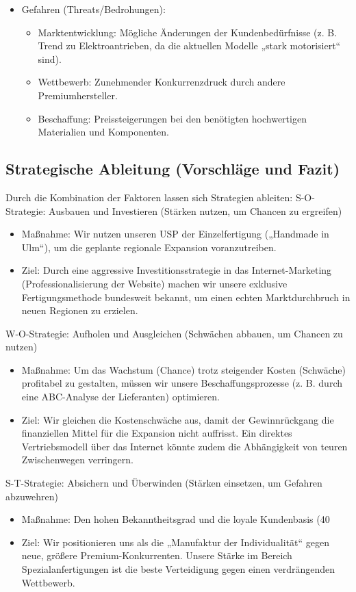 \documentclass[12pt, a4paper]{article}
\begin{document}
\begin{itemize}
    \item Gefahren (Threats/Bedrohungen):
        \begin{itemize}
            \item Marktentwicklung: Mögliche Änderungen der Kundenbedürfnisse (z. B. Trend zu Elektroantrieben, da die aktuellen Modelle „stark motorisiert“ sind).
            \item Wettbewerb: Zunehmender Konkurrenzdruck durch andere Premiumhersteller.
            \item Beschaffung: Preissteigerungen bei den benötigten hochwertigen Materialien und Komponenten.
        \end{itemize}
\end{itemize}

\subsection{Strategische Ableitung (Vorschläge und Fazit)}
Durch die Kombination der Faktoren lassen sich Strategien ableiten:
S-O-Strategie: Ausbauen und Investieren (Stärken nutzen, um Chancen zu ergreifen)
\begin{itemize}
    \item Maßnahme: Wir nutzen unseren USP der Einzelfertigung („Handmade in Ulm“), um die geplante regionale Expansion voranzutreiben.
    \item Ziel: Durch eine aggressive Investitionsstrategie in das Internet-Marketing (Professionalisierung der Website) machen wir unsere exklusive Fertigungsmethode bundesweit bekannt, um einen echten Marktdurchbruch in neuen Regionen zu erzielen.
\end{itemize}
W-O-Strategie: Aufholen und Ausgleichen (Schwächen abbauen, um Chancen zu nutzen)
\begin{itemize}
    \item Maßnahme: Um das Wachstum (Chance) trotz steigender Kosten (Schwäche) profitabel zu gestalten, müssen wir unsere Beschaffungsprozesse (z. B. durch eine ABC-Analyse der Lieferanten) optimieren.
    \item Ziel: Wir gleichen die Kostenschwäche aus, damit der Gewinnrückgang die finanziellen Mittel für die Expansion nicht auffrisst. Ein direktes Vertriebsmodell über das Internet könnte zudem die Abhängigkeit von teuren Zwischenwegen verringern.
\end{itemize}
 S-T-Strategie: Absichern und Überwinden (Stärken einsetzen, um Gefahren abzuwehren)
\begin{itemize}
    \item Maßnahme: Den hohen Bekanntheitsgrad und die loyale Kundenbasis (40 %
    \item Ziel: Wir positionieren uns als die „Manufaktur der Individualität“ gegen neue, größere Premium-Konkurrenten. Unsere Stärke im Bereich Spezialanfertigungen ist die beste Verteidigung gegen einen verdrängenden Wettbewerb.
\end{itemize}
\end{document}
